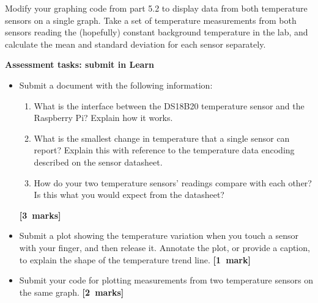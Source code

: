\begin{enumerate}

%


Modify your graphing code from part 5.2 to display data from both temperature sensors on a single graph.
Take a set of temperature measurements from both sensors reading the (hopefully) constant background temperature in the lab, and calculate the mean and standard deviation for each sensor separately.


\end{enumerate}

\newpage
{\bf Assessment tasks: submit in Learn}

\begin{itemize}

\item Submit a document with the following information:
\begin{enumerate}
\item What is the interface between the DS18B20 temperature sensor and the Raspberry Pi?
Explain how it works.
\item What is the smallest change in temperature that a single sensor can report?
Explain this with reference to the temperature data encoding described on the sensor datasheet.
\item How do your two temperature sensors' readings compare with each other?
Is this what you would expect from the datasheet?
\end{enumerate}
\hfill {\bf[3~marks]}

\item Submit a plot showing the temperature variation when you touch a sensor with your finger, and then release it.
Annotate the plot, or provide a caption, to explain the shape of the temperature trend line.
\hfill {\bf[1~mark]}

\item Submit your code for plotting measurements from two temperature sensors on the same graph.
\hfill {\bf[2~marks]}

\end{itemize}
